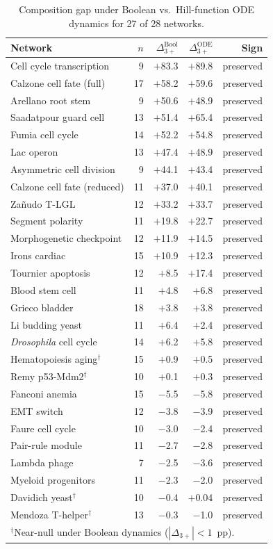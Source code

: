 \documentclass[10pt]{article}
\begin{document}
\begin{table}[h]
\centering
\caption{Composition gap under Boolean vs.\ Hill-function ODE
dynamics for 27 of 28 networks.}
\begin{tabular}{lrrrr}
\toprule
Network & $n$ & $\Delta_{3+}^{\mathrm{Bool}}$ & $\Delta_{3+}^{\mathrm{ODE}}$ & Sign \\
\midrule
Cell cycle transcription & 9 & $+$83.3 & $+$89.8 & preserved \\
Calzone cell fate (full) & 17 & $+$58.2 & $+$59.6 & preserved \\
Arellano root stem & 9 & $+$50.6 & $+$48.9 & preserved \\
Saadatpour guard cell & 13 & $+$51.4 & $+$65.4 & preserved \\
Fumia cell cycle & 14 & $+$52.2 & $+$54.8 & preserved \\
Lac operon & 13 & $+$47.4 & $+$48.9 & preserved \\
Asymmetric cell division & 9 & $+$44.1 & $+$43.4 & preserved \\
Calzone cell fate (reduced) & 11 & $+$37.0 & $+$40.1 & preserved \\
Za\~nudo T-LGL & 12 & $+$33.2 & $+$33.7 & preserved \\
Segment polarity & 11 & $+$19.8 & $+$22.7 & preserved \\
Morphogenetic checkpoint & 12 & $+$11.9 & $+$14.5 & preserved \\
Irons cardiac & 15 & $+$10.9 & $+$12.3 & preserved \\
Tournier apoptosis & 12 & $+$8.5 & $+$17.4 & preserved \\
Blood stem cell & 11 & $+$4.8 & $+$6.8 & preserved \\
Grieco bladder & 18 & $+$3.8 & $+$3.8 & preserved \\
Li budding yeast & 11 & $+$6.4 & $+$2.4 & preserved \\
\emph{Drosophila} cell cycle & 14 & $+$6.2 & $+$5.8 & preserved \\
Hematopoiesis aging$^\dagger$ & 15 & $+$0.9 & $+$0.5 & preserved \\
Remy p53-Mdm2$^\dagger$ & 10 & $+$0.1 & $+$0.3 & preserved \\
Fanconi anemia & 15 & $-$5.5 & $-$5.8 & preserved \\
EMT switch & 12 & $-$3.8 & $-$3.9 & preserved \\
Faure cell cycle & 10 & $-$3.0 & $-$2.4 & preserved \\
Pair-rule module & 11 & $-$2.7 & $-$2.8 & preserved \\
Lambda phage & 7 & $-$2.5 & $-$3.6 & preserved \\
Myeloid progenitors & 11 & $-$2.3 & $-$2.0 & preserved \\
Davidich yeast$^\dagger$ & 10 & $-$0.4 & $+$0.04 & preserved \\
Mendoza T-helper$^\dagger$ & 13 & $-$0.3 & $-$1.0 & preserved \\
\bottomrule
\multicolumn{5}{l}{\footnotesize $^\dagger$Near-null under Boolean dynamics ($|\Delta_{3+}| < 1$~pp).} \\
\end{tabular}
\end{table}
\end{document}
